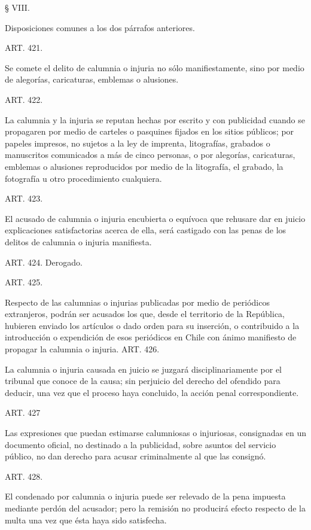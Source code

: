     § VIII.

    Disposiciones comunes a los dos párrafos anteriores.








    ART. 421.

    Se comete el delito de calumnia o injuria no sólo manifiestamente, sino por medio de alegorías, caricaturas, emblemas o alusiones.


    ART. 422.

    La calumnia y la injuria se reputan hechas por escrito y con publicidad cuando se propagaren por medio de carteles o pasquines fijados en los sitios públicos; por papeles impresos, no sujetos a la ley de imprenta, litografías, grabados o manuscritos comunicados a más de cinco personas, o por alegorías, caricaturas, emblemas o alusiones reproducidos por medio de la litografía, el grabado, la fotografía u otro procedimiento cualquiera.



    ART. 423.

    El acusado de calumnia o injuria encubierta o equívoca que rehusare dar en juicio explicaciones satisfactorias acerca de ella, será castigado con las penas de los delitos de calumnia o injuria manifiesta.

    ART. 424. Derogado.

    ART. 425.

    Respecto de las calumnias o injurias publicadas por medio de periódicos extranjeros, podrán ser acusados los que, desde el territorio de la República, hubieren enviado los artículos o dado orden para su inserción, o contribuido a la introducción o expendición de esos periódicos en Chile con ánimo manifiesto de propagar la calumnia o injuria.
    ART. 426.

    La calumnia o injuria causada en juicio se juzgará disciplinariamente por el tribunal que conoce de la causa; sin perjuicio del derecho del ofendido para deducir, una vez que el proceso haya concluido, la acción penal correspondiente.


    ART. 427

    Las expresiones que puedan estimarse calumniosas o injuriosas, consignadas en un documento oficial, no destinado a la publicidad, sobre asuntos del servicio público, no dan derecho para acusar criminalmente al que las consignó.


    ART. 428.

    El condenado por calumnia o injuria puede ser relevado de la pena impuesta mediante perdón del acusador; pero la remisión no producirá efecto respecto de la multa una vez que ésta haya sido satisfecha.

